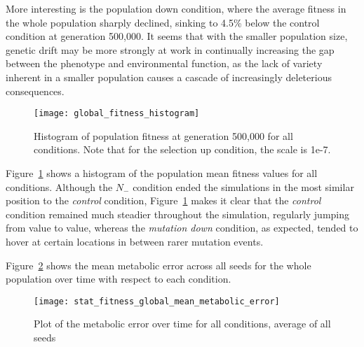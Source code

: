 More interesting is the population down condition, where the average fitness in the whole population sharply declined, sinking to 4.5\% below the control condition at generation 500,000. It seems that with the smaller population size, genetic drift may be more strongly at work in continually increasing the gap between the phenotype and environmental function, as the lack of variety inherent in a smaller population causes a cascade of increasingly deleterious consequences. 

\begin{figure}[H]
	\texttt{[image: global\_fitness\_histogram]}
	\caption[Mean fitness histogram]{Histogram of population fitness at generation 500,000 for all conditions. Note that for the selection up condition, the scale is 1e-7.}
	\label{fig:global_fitness_histogram}
\end{figure}
Figure~\ref{fig:global_fitness_histogram} shows a histogram of the population mean fitness values for all conditions. Although the $N_-$ condition ended the simulations in the most similar position to the \textit{control} condition, Figure~\ref{fig:global_fitness_histogram} makes it clear that the \textit{control} condition remained much steadier throughout the simulation, regularly jumping from value to value, whereas the \textit{mutation down} condition, as expected, tended to hover at certain locations in between rarer mutation events. 

Figure~\ref{fig:mean_metabolic_error} shows the mean metabolic error across all seeds for the whole population over time with respect to each condition. 
\begin{figure}[H]
	\texttt{[image: stat\_fitness\_global\_mean\_metabolic\_error]}
	\caption[Metabolic error]{Plot of the metabolic error over time for all conditions, average of all seeds}
	\label{fig:mean_metabolic_error}
\end{figure}

